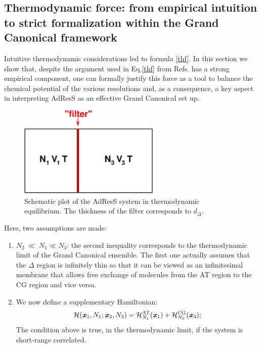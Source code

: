 \documentclass[aip,jcp,a4paper,reprint,onecolumn]{revtex4-1}
\newcommand{\vect}[1]{\textbf{\textit{#1}}}
\newcommand{\AT}{{\textrm{{AT}}}}
\newcommand{\CG}{{\textrm{CG}}}
\newcommand{\HY}{{\Delta}}
\begin{document}
\subsection{Thermodynamic force: from empirical intuition to strict formalization within the Grand Canonical framework}
Intuitive thermodynamic considerations led to formula \eqref{thf}. In this section we show that, despite the argument used in Eq.\ref{thf} from Refs.\cite{prlgc,rdfcorr} has a strong empirical component, one can formally justify this force
as a tool to balance the chemical potential of the various resolutions and, as a consequence,  a key aspect in interpreting AdResS as an effective Grand Canonical set up. 
\begin{figure}
  \centering
  \begin{minipage}[t]{0.49\linewidth}
  \includegraphics[width=0.6\textwidth]{fig.grand/partition.eps}    
  \end{minipage}
  \caption{Schematic plot of the AdResS system in thermodynamic equilibrium. The thickness of the filter corresponds to $d_{\Delta}$.}
  \label{fig:tmp1}
\end{figure}
Here, two assumptions are made:
\begin{enumerate}\itemsep -1pt
\item $N_2\ {\ll}\ N_1 \ll N_3$: the second inequality corresponds to
  the thermodynamic limit of the Grand Canonical ensemble. The first
  one actually assumes that the $\HY$ region is infinitely thin so that it
  can be viewed as an infinitesimal membrane that allows free exchange of molecules from
  the AT region to the CG region and vice versa.
\item We now define a supplementary Hamiltonian:
  \begin{equation}
    \mathcal H(\vect x_1, N_1; \vect x_3, N_3) =
    \mathcal H_{N_1}^{\AT}(\vect x_1) + \mathcal H_{N_3}^{\CG}(\vect x_3); 
  \end{equation}
  The condition above is true, in the thermodynamic limit, if the system is
  short-range correlated.
\end{enumerate}
\end{document}
